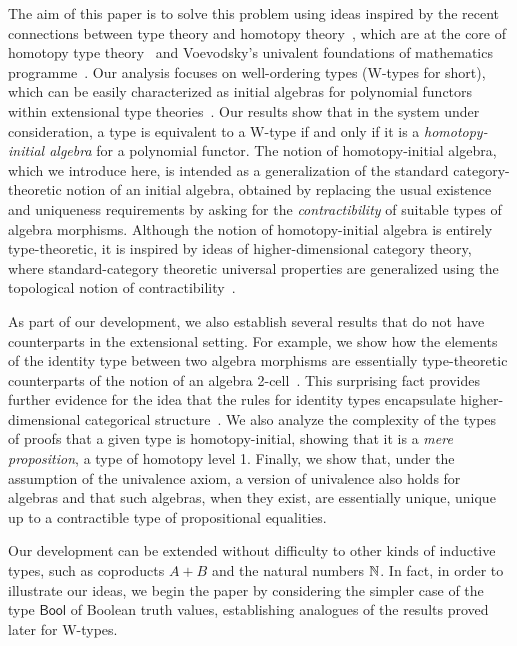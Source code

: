 \documentclass[10pt,a4paper,oneside,reqno]{amsart}
\numberwithin{equation}{section}
\theoremstyle{mythm}
\theoremstyle{mydef}
\theoremstyle{myrmk}
\newcommand{\ie}{\text{i.e.\ }}
\newcommand{\Bool}{\mathsf{Bool}}
\begin{document}
The aim of this paper is to solve this problem using ideas inspired by the
recent connections between type theory and homotopy theory~\cite{AwodeyS:homtmi,ssets}, which are at the core of homotopy type theory~\cite{hott} and Voevodsky's univalent foundations of mathematics programme~\cite{VoevodskyV:notts}. 
Our analysis focuses on well-ordering types (W-types for short),
which can be easily characterized as initial algebras for polynomial functors within extensional type
theories~\cite{AbbottM:concsp,DybjerP:repids,GambinoN:weltdp,MoerdijkI:weltc}. Our
results show that in the system under consideration, a type is equivalent to a W-type if and only if
it is a \emph{homotopy-initial algebra} for a polynomial functor. The notion of homotopy-initial
algebra, which we introduce here, is intended as a generalization of the standard category-theoretic
notion of an initial algebra, obtained by replacing the usual existence and uniqueness requirements
by asking for the \emph{contractibility} of suitable types of algebra morphisms. Although the notion 
of homotopy-initial algebra is entirely type-theoretic, it is inspired by ideas of higher-dimensional
category theory, where standard-category theoretic universal properties are generalized using the topological
 notion of contractibility~\cite{LurieJ:higtt}. 

As part of our development, we also establish several results that do not have counterparts in the extensional setting.  
For  example, we show how the elements of the identity type between two algebra morphisms are essentially
 type-theoretic counterparts of the notion of an algebra 2-cell~\cite{BlackwellR:twodmt}.
This surprising fact provides further evidence for the idea that the rules for identity types encapsulate 
higher-dimensional categorical structure~\cite{LumsdaineP:weaci,vandenBergB:typwg}. We also
analyze the complexity of the types of proofs that a given type is homotopy-initial, showing that it
is a \emph{mere proposition}, \ie a type of homotopy level 1. Finally, we show that, 
under the assumption of the univalence axiom, a version of univalence  also holds for
algebras and that such algebras, when they exist, are
essentially unique, \ie unique up to a contractible type of propositional equalities. 

Our development can be extended without difficulty to other kinds of inductive types, such as coproducts $A + B$ and the natural numbers  $\mathbb{N}$.  In fact, in order to illustrate our ideas,  we begin the paper by considering the simpler case
of the type $\Bool$ of Boolean truth values, establishing analogues of the results proved
later for W-types. 
\end{document}
